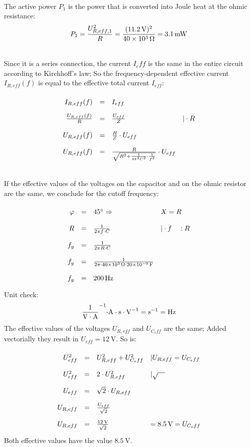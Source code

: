 \documentclass[a4paper]{article}
\begin{document}
	\\
	The active power $P_1$ is the power that is converted into Joule heat at the ohmic resistance:
	$$P_1 = {U_{R,eff,1}^2 \over R} = {(\SI{11,2}{\volt})^2 \over \SI{40e3}{\ohm}} = \SI{3,1}{\milli\watt}$$
	\vspace{0.5 cm}
	
	\\
	Since it is a series connection, the current $I_eff$ is the same in the entire circuit according to Kirchhoff's law; So the frequency-dependent effective current $I_{R,eff}(f)$ is equal to the effective total current $I_{eff}$:
	$$
	\renewcommand{\arraystretch}{2}
	\begin{array}{rcll}
		I_{R,eff}(f) & = & I_{eff} \\
		{U_{R,eff}(f) \over R} & = & {U_{eff}\over Z} &|\cdot R\\
		U_{R,eff}(f) & = & {R \over Z} \cdot U_{eff} \\
		U_{R,eff}(f) & = & {R \over \sqrt{R^2 + {1 \over 4 \pi^2 C^2} \cdot {1 \over f^2}}} \cdot U_{eff}
	\end{array}
	$$
	\vspace{0.5 cm}
	
	\\
	If the effective values of the voltages on the capacitor and on the ohmic resistor are the same, we conclude for the cutoff frequency:
	$$
	\renewcommand{\arraystretch}{2}
	\begin{array}{rcll}
		\varphi & = & 45^\circ \Rightarrow & X = R \\
		R & = & {1 \over 2 \pi f \cdot C} & | \cdot f \quad :R\\
		f_g & = & {1 \over 2 \pi R \cdot C}\\
		f_g & = & {1 \over 2 \pi \cdot \SI{40e3}{\ohm} \cdot \SI{20e-9}{\farad}}\\
		f_g & = & \SI{200}{\hertz}
	\end{array}
	$$
	Unit check:
	$$\SI{}{1 \over \volt\cdot \ampere^{-1}\cdot \ampere\cdot \second \cdot \volt^{-1}}= \SI{}{\second^{- 1}}=\SI{}{\hertz}$$
	The effective values of the voltages $U_{R,eff}$ and $U_{C_eff}$ are the same; Added vectorially they result in $U_{eff}=\SI{12}{\volt}$. So is:
	$$
	\renewcommand{\arraystretch}{2}
	\begin{array}{rcll}
		U_{eff}^2 & = & U_{R,eff}^2+ U_{C_eff}^2 & | U_{R,eff} = U_{C_eff}\\
		U_{eff}^2 & = & 2\cdot U_{R,eff}^2 &| \sqrt{\quad} \\
		U_{eff} & = & \sqrt{2} \cdot U_{R,eff} \\
		U_{R,eff} & = & {U_{eff} \over \sqrt{2}} \\
		U_{R,eff} & = & {\SI{12}{\volt} \over \sqrt{2}} & = \SI{8.5}{\volt} = U_{C_eff}
	\end{array}
	$$
	Both effective values have the value $\SI{8.5}{\volt}$.
	\vspace{0.5 cm}
	
\end{document}
